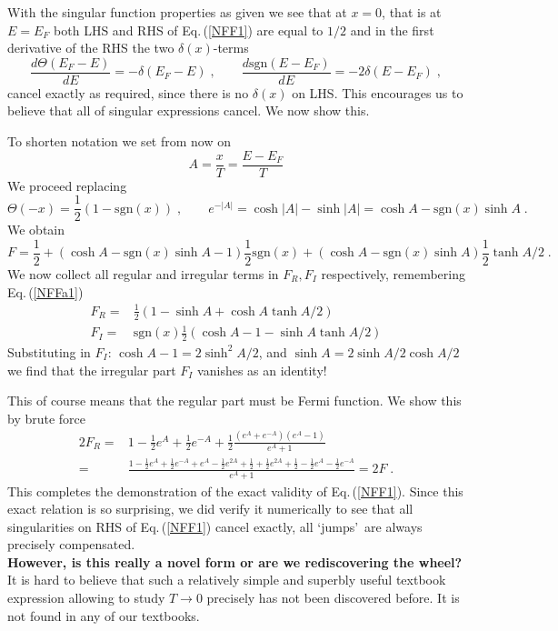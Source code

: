 \documentclass[12pt]{article}
\begin{document}
With the singular function properties as given  we see that at $x=0$, that is at  $E=E_F$ both LHS and RHS of Eq.\,(\ref{NFF1}) are equal to $1/2$ and in the first derivative of the   RHS the two $\delta(x)$-terms 
\begin{equation}\label{NFF1b}
\frac{d\Theta(E_F-E)}{dE}=-\delta(E_F-E)\;,\qquad 
\frac{d\mathrm{sgn}(E -E_F)}{dE}=-2\delta(E-E_F)\;, 
 \end{equation}
cancel exactly as required, since there is no $\delta(x)$ on LHS. This encourages us to believe that all of singular expressions cancel. We now show this. 

To shorten notation we set from now on
\begin{equation}
A = \frac{x}{T}= \frac{E-E_F}{T}
\end{equation}
We proceed replacing 
 \begin{equation}\label{NFF4}
\Theta(-x)=\frac 1 2 (1-\mathrm{sgn}(x))\;,\qquad 
e^{-|A|}=\cosh|A|-\sinh|A|=\cosh A- \mathrm{sgn}(x)\sinh A\;.
\end{equation}
We obtain
 \begin{equation}\label{NFF5}
 F=\frac 1 2 +\left(\cosh A- \mathrm{sgn}(x)\sinh A -1\right)\frac 1 2 \mathrm{sgn}(x)
 +\left(\cosh A- \mathrm{sgn}(x)\sinh A \right)\frac 1 2\tanh A/2\;.
\end{equation}
We now collect all regular and irregular terms in $F_R, F_I$ respectively, remembering Eq.\,(\ref{NFFa1})
 \begin{align}\label{NFF5a}
 F_R=& \frac 1 2 \left(1-\sinh A +\cosh A \tanh A/2\right) \\
 F_I=& \mathrm{sgn}(x) \frac 1 2 \left(\cosh A-1 - \sinh A \tanh A/2\right)
 \label{NFF5b}
\end{align}
Substituting in $F_I$: $\cosh A-1= 2\sinh^2 A/2$, and $\sinh A=2 \sinh A/2 \cosh A/2$ we find that the irregular part  $F_I$ vanishes as an identity! 

This of course means that the regular part must be  Fermi function. We show this by brute force
\begin{align}\label{NFF5c}
2 F_R=&  1-\frac 1 2 e^A + \frac 1 2 e^{-A}+\frac 1 2 \frac{(e^A+e^{-A})(e^A-1)}{e^A+1}\\[0.4cm]
  =&\frac{1-\frac 12 e^A+\frac 12 e^{-A}+e^A -\frac 1 2 e^{2A}+\frac 12 +\frac 12  e^{2A}+\frac 1 2-\frac 12 e^A-\frac 1 2 e^{-A}}{e^A+1}=2F\;.
 \label{NFF5d}
\end{align}
This completes the demonstration of the exact validity of  Eq.\,(\ref{NFF1}). Since this exact relation is so surprising, we did verify it  numerically to see that all singularities on RHS  of  Eq.\,(\ref{NFF1}) cancel exactly, all \lq jumps\rq\ are always precisely compensated.\\

 
{\bf However, is this really a novel form or are we rediscovering the wheel?} It is hard to believe that such a relatively simple and superbly useful textbook expression allowing to study $T\to 0$ precisely   has not been discovered before. It is not found in any of our textbooks.
 
\end{document}
